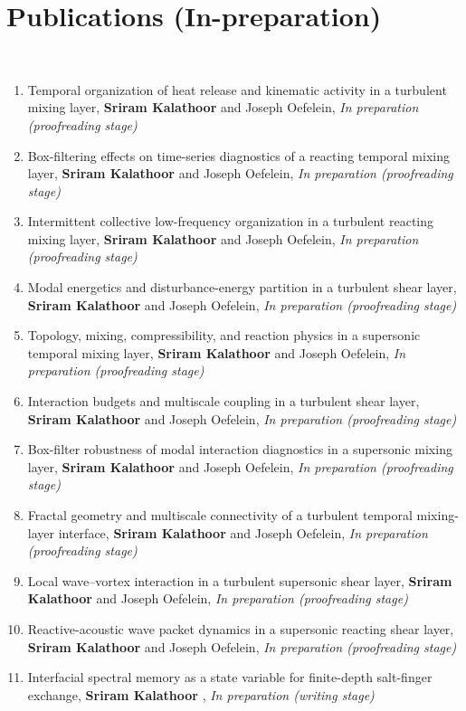 \documentclass[letterpaper,11pt]{article}
\begin{document}
\section{Publications (In-preparation)}
~\\
  \begin{enumerate}
    \item {Temporal organization of heat release and kinematic activity in a turbulent mixing layer}, \textbf{Sriram Kalathoor} and Joseph Oefelein, \emph{In preparation (proofreading stage)}
    \item {Box-filtering effects on time-series diagnostics of a reacting temporal mixing layer}, \textbf{Sriram Kalathoor} and Joseph Oefelein, \emph{In preparation (proofreading stage)}
    \item {Intermittent collective low-frequency organization in a turbulent reacting mixing layer}, \textbf{Sriram Kalathoor} and Joseph Oefelein, \emph{In preparation (proofreading stage)}
    \item {Modal energetics and disturbance-energy partition in a  turbulent shear layer}, \textbf{Sriram Kalathoor} and Joseph Oefelein, \emph{In preparation (proofreading stage)}
    \item {Topology, mixing, compressibility, and reaction physics in a supersonic temporal mixing layer}, \textbf{Sriram Kalathoor} and Joseph Oefelein, \emph{In preparation (proofreading stage)}
    \item {Interaction budgets and multiscale coupling in a turbulent shear layer}, \textbf{Sriram Kalathoor} and Joseph Oefelein, \emph{In preparation (proofreading stage)}
    \item {Box-filter robustness of modal interaction diagnostics in a supersonic mixing layer}, \textbf{Sriram Kalathoor} and Joseph Oefelein, \emph{In preparation (proofreading stage)}
\end{enumerate}
\clearpage\vspace*{3pt}
\begin{enumerate}
\setcounter{enumi}{7}
     \item {Fractal geometry and multiscale connectivity of a turbulent temporal mixing-layer interface}, \textbf{Sriram Kalathoor} and Joseph Oefelein, \emph{In preparation (proofreading stage)}
      \item {Local wave--vortex interaction in a turbulent supersonic shear layer}, \textbf{Sriram Kalathoor} and Joseph Oefelein, \emph{In preparation (proofreading stage)}
      \item {Reactive-acoustic wave packet dynamics in a supersonic reacting shear layer}, \textbf{Sriram Kalathoor} and Joseph Oefelein, \emph{In preparation (proofreading stage)}
      \item {Interfacial spectral memory as a state variable for finite-depth salt-finger exchange}, \textbf{Sriram Kalathoor} , \emph{In preparation (writing stage)}
  \end{enumerate}
\end{document}
